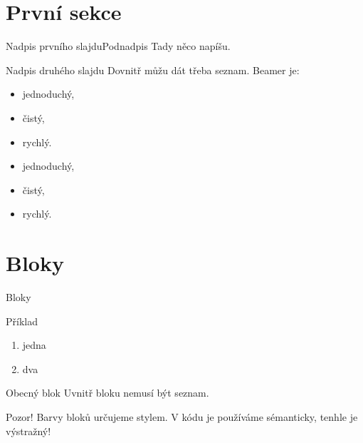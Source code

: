 
\section{První sekce}
\begin{frame}{Nadpis prvního slajdu}{Podnadpis}
Tady něco napíšu.
\end{frame}

\begin{frame}{Nadpis druhého slajdu}
Dovnitř můžu dát třeba seznam. Beamer je:

\begin{itemize}
\item jednoduchý, \pause
\item čistý, \pause
\item rychlý. \pause
\end{itemize}

\begin{itemize}[<+->]
\item jednoduchý,
\item čistý,
\item rychlý.
\end{itemize}

\end{frame}

\section{Bloky}
\begin{frame}{Bloky}

\pause
\begin{exampleblock}{Příklad}
\begin{enumerate}
\item jedna
\item dva
\end{enumerate}
\end{exampleblock}
\pause
\begin{block}{Obecný blok}
Uvnitř bloku nemusí být seznam.
\end{block}
\pause
\begin{alertblock}{Pozor!}
Barvy bloků určujeme stylem. V kódu je používáme sémanticky, tenhle je výstražný!
\end{alertblock}
\end{frame}


